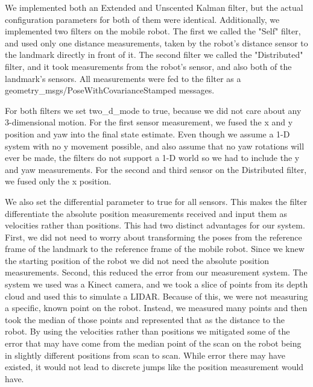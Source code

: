 \documentclass[conference]{IEEEtran}
\begin{document}
We implemented both an Extended and Unscented Kalman filter, but the actual configuration parameters for both of them 
were identical. Additionally, we implemented two filters on the mobile robot. The first we called the "Self" filter, 
and used only one distance measurements, taken by the robot's distance sensor to the landmark directly in front of it. 
The second filter we called the "Distributed" filter, and it took measurements from the robot's sensor, and also both 
of the landmark's sensors. All measurements were fed to the filter as a geometry\_msgs/PoseWithCovarianceStamped 
messages.

For both filters we set two\_d\_mode to true, because we did not care about any 3-dimensional motion. For the first 
sensor measurement, we fused the x and y position and yaw into the final state estimate. Even though we assume a 1-D 
system with no y movement possible, and also assume that no yaw rotations will ever be made, the filters do not support 
a 1-D world so we had to include the y and yaw measurements. For the second and third sensor on the Distributed filter, 
we fused only the x position.

We also set the differential parameter to true for all sensors. This makes the filter differentiate the absolute 
position measurements received and input them as velocities rather than positions. This had two distinct advantages for 
our system. First, we did not need to worry about transforming the poses from the reference frame of the landmark to 
the reference frame of the mobile robot. Since we knew the starting position of the robot we did not need the absolute 
position measurements. Second, this reduced the error from our measurement system. The system we used was a Kinect 
camera, and we took a slice of points from its depth cloud and used this to simulate a LIDAR. Because of this, we were 
not measuring a specific, known point on the robot. Instead, we measured many points and then took the median of those 
points and represented that as the distance to the robot. By using the velocities rather than positions we mitigated 
some of the error that may have come from the median point of the scan on the robot being in slightly different 
positions from scan to scan. While error there may have existed, it would not lead to discrete jumps like the position 
measurement would have.
\end{document}
